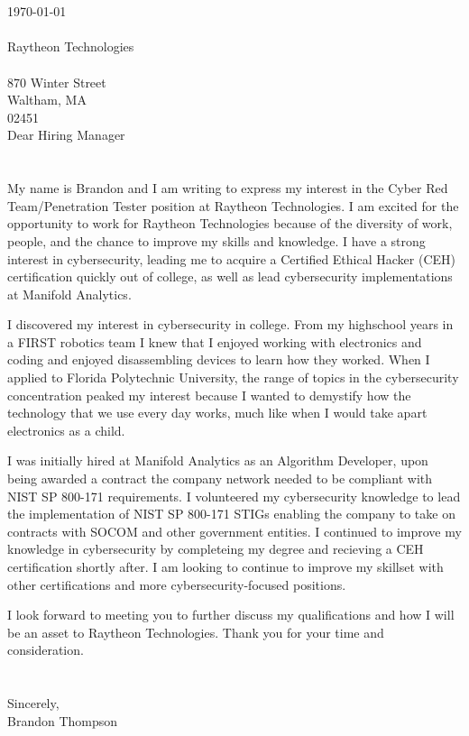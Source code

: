 \documentclass{resume} %
\newcommand\company{Raytheon Technologies}
\newcommand\position{Cyber Red Team/Penetration Tester}
\newcommand\location{870 Winter Street\\Waltham, MA\\02451}
\begin{document}

\begin{rSection}{}
\ \\\
\\
\today \\
\\
\company{}\\
\\
\location{}\\

Dear Hiring Manager\\
\\
\\
My name is Brandon and I am writing to express my interest in the \position{} position at \company{}.
I am excited for the opportunity to work for \company{} because of the diversity of work, people, and the chance to improve my skills and knowledge.
I have a strong interest in cybersecurity, leading me to acquire a Certified Ethical Hacker (CEH) certification quickly out of college, as well as lead cybersecurity implementations at Manifold Analytics.

I discovered my interest in cybersecurity in college. From my highschool years in a FIRST robotics team I knew that I enjoyed working with electronics and coding and enjoyed disassembling devices to learn how they worked. When I applied to Florida Polytechnic University, the range of topics in the cybersecurity concentration peaked my interest because I wanted to demystify how the technology that we use every day works, much like when I would take apart electronics as a child.

I was initially hired at Manifold Analytics as an Algorithm Developer, upon being awarded a contract the company network needed to be compliant with NIST SP 800-171 requirements. I volunteered my cybersecurity knowledge to lead the implementation of NIST SP 800-171 STIGs enabling the company to take on contracts with SOCOM and other government entities. I continued to improve my knowledge in cybersecurity by completeing my degree and recieving a CEH certification shortly after. I am looking to continue to improve my skillset with other certifications and more cybersecurity-focused positions.

I look forward to meeting you to further discuss my qualifications and how I will be an asset to \company{}.
Thank you for your time and consideration.
\\
\\
\\
Sincerely,\\
Brandon Thompson


\end{rSection}
\end{document}
